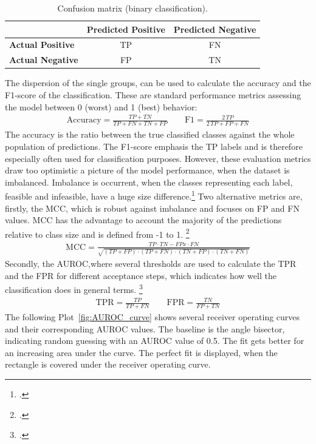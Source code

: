 \begin{table}[ht]
    \centering
    \begin{tabular}{@{}lcc@{}}
        \toprule
                                 & \textbf{Predicted Positive} & \textbf{Predicted Negative} \\
        \midrule
        \textbf{Actual Positive} & \Gls{TP}                    & \Gls{FN}                    \\
        \textbf{Actual Negative} & \Gls{FP}                    & \Gls{TN}                    \\
        \bottomrule
    \end{tabular}
    \caption{Confusion matrix (binary classification).}
    \label{tab:confusion_matrix}
\end{table}

The dispersion of the single groups, can be used to calculate the accuracy and the F1-score of the classification.
These are standard performance metrics assessing the model between 0 (worst) and 1 (best) behavior:
\begin{align}
    \text{Accuracy}=\frac{TP+TN}{TP+FN+TN+FP}
    \qquad
    \text{F1}=\frac{2\,TP}{2\,TP+FP+FN}
\end{align}
The accuracy is the ratio between the true classified classes against the whole population
of predictions. The F1-score emphasis the \gls{TP} labels and is therefore especially
often used for classification purposes.
However, these evaluation metrics draw too optimistic a picture of the model performance,
when the dataset is imbalanced. Imbalance is occurrent,
when the classes representing each label, feasible and infeasible, have a huge size difference.\footcite[cf.][p.2f.]{chicco_advantages_2020}
Two alternative metrics are, firstly, the \gls{MCC}, which is robust against imbalance
and focuses on \gls{FP} and \gls{FN} values. \gls{MCC} has the advantage to account the majority of the predictions
relative to class size and is defined from -1 to 1. \footcite[cf.][p.5]{chicco_advantages_2020}
\begin{align}
    \text{MCC}=\frac{TP \cdot TN - FP x\cdot FN}{\sqrt{(TP+FP)\cdot(TP+FN)\cdot(TN+FP)\cdot(TN+FN)}}
\end{align}
Secondly, the \gls{AUROC},where several thresholds are used
to calculate the \gls{TPR} and the \gls{FPR} for different acceptance steps,
which indicates how well the classification does in general terms. \footcite[cf.][p.2f.]{chicco_advantages_2020}
\begin{align}
    \text{TPR}=\frac{TP}{TP+FN}
    \qquad
    \text{FPR}=\frac{TN}{FP+TN}
\end{align}
The following Plot~\ref{fig:AUROC_curve} shows several receiver operating curves and their corresponding \gls{AUROC} values.
The baseline is the angle bisector, indicating random guessing with an \gls{AUROC} value of 0.5. The fit gets better
for an increasing area under the curve. The perfect fit is displayed, when the rectangle is covered under the receiver operating curve.

